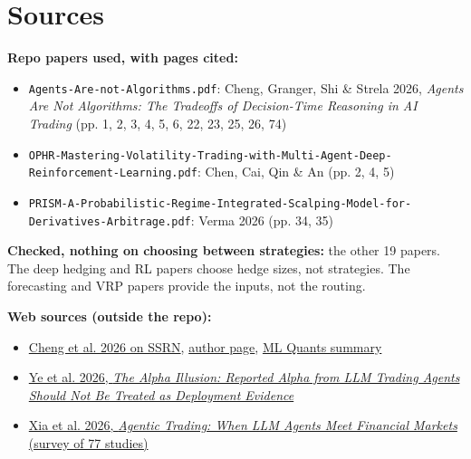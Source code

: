 \documentclass{article}
\begin{document}
\section{Sources}

\textbf{Repo papers used, with pages cited:}

\begin{itemize}

\item \texttt{Agents-\allowbreak{}Are-\allowbreak{}not-\allowbreak{}Algorithms.\allowbreak{}pdf}: Cheng, Granger, Shi \& Strela 2026, \emph{Agents Are Not Algorithms: The Tradeoffs of Decision-Time Reasoning in AI Trading} (pp. 1, 2, 3, 4, 5, 6, 22, 23, 25, 26, 74)

\item \texttt{OPHR-\allowbreak{}Mastering-\allowbreak{}Volatility-\allowbreak{}Trading-\allowbreak{}with-\allowbreak{}Multi-\allowbreak{}Agent-\allowbreak{}Deep-\allowbreak{}Reinforcement-\allowbreak{}Learning.\allowbreak{}pdf}: Chen, Cai, Qin \& An (pp. 2, 4, 5)

\item \texttt{PRISM-\allowbreak{}A-\allowbreak{}Probabilistic-\allowbreak{}Regime-\allowbreak{}Integrated-\allowbreak{}Scalping-\allowbreak{}Model-\allowbreak{}for-\allowbreak{}Derivatives-\allowbreak{}Arbitrage.\allowbreak{}pdf}: Verma 2026 (pp. 34, 35)

\end{itemize}

\textbf{Checked, nothing on choosing between strategies:} the other 19 papers. The deep hedging and RL papers choose hedge sizes, not strategies. The forecasting and VRP papers provide the inputs, not the routing.

\textbf{Web sources (outside the repo):}

\begin{itemize}

\item \href{https://papers.ssrn.com/abstract=6713620}{Cheng et al. 2026 on SSRN}, \href{https://inghawcheng.github.io/}{author page}, \href{https://mlquants.substack.com/p/agents-are-not-algorithms-the-tradeoffs}{ML Quants summary}

\item \href{https://arxiv.org/abs/2605.16895}{Ye et al. 2026, \emph{The Alpha Illusion: Reported Alpha from LLM Trading Agents Should Not Be Treated as Deployment Evidence}}

\item \href{https://arxiv.org/abs/2605.19337}{Xia et al. 2026, \emph{Agentic Trading: When LLM Agents Meet Financial Markets} (survey of 77 studies)}

\end{itemize}
\end{document}
